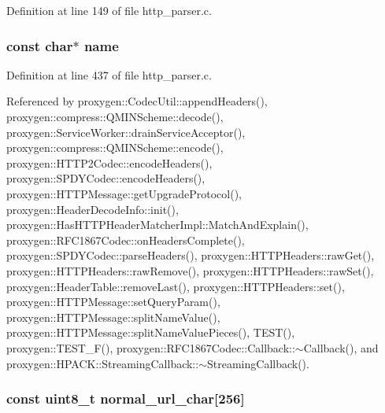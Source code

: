 Definition at line 149 of file http\+\_\+parser.\+c.

\subsubsection[{name}]{\setlength{\rightskip}{0pt plus 5cm}const char$\ast$ name}\label{http__parser_8c_a8f8f80d37794cde9472343e4487ba3eb}


Definition at line 437 of file http\+\_\+parser.\+c.



Referenced by proxygen\+::\+Codec\+Util\+::append\+Headers(), proxygen\+::compress\+::\+Q\+M\+I\+N\+Scheme\+::decode(), proxygen\+::\+Service\+Worker\+::drain\+Service\+Acceptor(), proxygen\+::compress\+::\+Q\+M\+I\+N\+Scheme\+::encode(), proxygen\+::\+H\+T\+T\+P2\+Codec\+::encode\+Headers(), proxygen\+::\+S\+P\+D\+Y\+Codec\+::encode\+Headers(), proxygen\+::\+H\+T\+T\+P\+Message\+::get\+Upgrade\+Protocol(), proxygen\+::\+Header\+Decode\+Info\+::init(), proxygen\+::\+Has\+H\+T\+T\+P\+Header\+Matcher\+Impl\+::\+Match\+And\+Explain(), proxygen\+::\+R\+F\+C1867\+Codec\+::on\+Headers\+Complete(), proxygen\+::\+S\+P\+D\+Y\+Codec\+::parse\+Headers(), proxygen\+::\+H\+T\+T\+P\+Headers\+::raw\+Get(), proxygen\+::\+H\+T\+T\+P\+Headers\+::raw\+Remove(), proxygen\+::\+H\+T\+T\+P\+Headers\+::raw\+Set(), proxygen\+::\+Header\+Table\+::remove\+Last(), proxygen\+::\+H\+T\+T\+P\+Headers\+::set(), proxygen\+::\+H\+T\+T\+P\+Message\+::set\+Query\+Param(), proxygen\+::\+H\+T\+T\+P\+Message\+::split\+Name\+Value(), proxygen\+::\+H\+T\+T\+P\+Message\+::split\+Name\+Value\+Pieces(), T\+E\+S\+T(), proxygen\+::\+T\+E\+S\+T\+\_\+\+F(), proxygen\+::\+R\+F\+C1867\+Codec\+::\+Callback\+::$\sim$\+Callback(), and proxygen\+::\+H\+P\+A\+C\+K\+::\+Streaming\+Callback\+::$\sim$\+Streaming\+Callback().

\subsubsection[{normal\+\_\+url\+\_\+char}]{\setlength{\rightskip}{0pt plus 5cm}const uint8\+\_\+t normal\+\_\+url\+\_\+char[256]\hspace{0.3cm}{\ttfamily [static]}}\label{http__parser_8c_ab9e25c10b444cd551b4ad019892abc0b}



